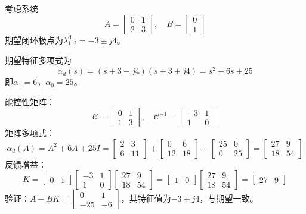 \begin{example}[二阶系统的极点配置]
考虑系统
\[
A = \begin{bmatrix} 0 & 1 \\ 2 & 3 \end{bmatrix},\quad B = \begin{bmatrix} 0 \\ 1 \end{bmatrix}
\]
期望闭环极点为$\lambda_{1,2}^{\mathrm{d}} = -3 \pm j4$。

期望特征多项式为
\[
\alpha_d(s) = (s + 3 - j4)(s + 3 + j4) = s^2 + 6s + 25
\]
即$\alpha_1 = 6$，$\alpha_0 = 25$。

能控性矩阵：
\[
\mathcal{C} = \begin{bmatrix} 0 & 1 \\ 1 & 3 \end{bmatrix},\quad \mathcal{C}^{-1} = \begin{bmatrix} -3 & 1 \\ 1 & 0 \end{bmatrix}
\]
矩阵多项式：
\[
\alpha_d(A) = A^2 + 6A + 25I = \begin{bmatrix} 2 & 3 \\ 6 & 11 \end{bmatrix} + \begin{bmatrix} 0 & 6 \\ 12 & 18 \end{bmatrix} + \begin{bmatrix} 25 & 0 \\ 0 & 25 \end{bmatrix} = \begin{bmatrix} 27 & 9 \\ 18 & 54 \end{bmatrix}
\]
反馈增益：
\[
K = \begin{bmatrix} 0 & 1 \end{bmatrix} \begin{bmatrix} -3 & 1 \\ 1 & 0 \end{bmatrix} \begin{bmatrix} 27 & 9 \\ 18 & 54 \end{bmatrix} = \begin{bmatrix} 1 & 0 \end{bmatrix} \begin{bmatrix} 27 & 9 \\ 18 & 54 \end{bmatrix} = \begin{bmatrix} 27 & 9 \end{bmatrix}
\]
验证：$A - BK = \begin{bmatrix} 0 & 1 \\ -25 & -6 \end{bmatrix}$，其特征值为$-3 \pm j4$，与期望一致。
\end{example}

